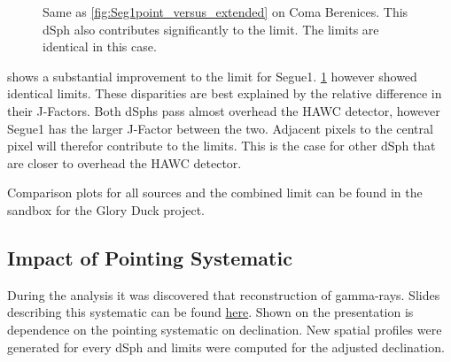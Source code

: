 \begin{figure}[h]
    \caption{Same as \cref{fig:Seg1point_versus_extended} on Coma Berenices. This dSph also contributes significantly to the limit. The limits are identical in this case.}
\label{fig:ComaBpoint_versus_extended}
\end{figure}

 shows a substantial improvement to the limit for Segue1.
\cref{fig:ComaBpoint_versus_extended} however showed identical limits.
These disparities are best explained by the relative difference in their J-Factors.
Both dSphs pass almost overhead the HAWC detector, however Segue1 has the larger J-Factor between the two.
Adjacent pixels to the central pixel will therefor contribute to the limits.
This is the case for other dSph that are closer to overhead the HAWC detector.

Comparison plots for all sources and the combined limit can be found in the sandbox for the Glory Duck project.

\subsection{Impact of Pointing Systematic}\label{sec:gd_pointing_sys}

During the analysis it was discovered that reconstruction of gamma-rays.
Slides describing this systematic can be found \href{https://private.hawc-observatory.org/wiki/images/3/30/HAWCMeetingOct2020-AJS-Pointing.pdf}{here}.
Shown on the presentation is dependence on the pointing systematic on declination.
New spatial profiles were generated for every dSph and limits were computed for the adjusted declination.

